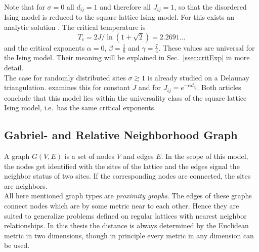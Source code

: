     Note that for \(\sigma = 0\) all \(d_{ij} = 1\) and therefore all
    \(J_{ij} = 1\), so that the disordered Ising model is reduced to the
    square lattice Ising model. For this exists an analytic solution \cite{Onsager1944}.
    The critical temperature is
    \begin{equation}
        T_c = 2J/\ln(1+\sqrt 2) = 2.2691...
        \label{eq:exactTc}
    \end{equation}
    and the critical exponents \(\alpha = 0\), \(\beta = \frac{1}{8}\)
    and \(\gamma = \frac{7}{4}\). These values are universal for the Ising
    model. Their meaning will be explained in Sec.\ \ref{ssec:critExp} in more detail.\\
    The case for randomly distributed sites \(\sigma \gtrsim 1\) is
    already studied on a Delaunay triangulation. \cite{Janke1994} examines
    this for constant \(J\) and \cite{Lima2000} for \(J_{ij} = e^{-\alpha d_{ij}}\).
    Both articles conclude that this model lies within the universality
    class of the square lattice Ising model, i.e.\ has the same critical
    exponents.

\subsection{Gabriel- and Relative Neighborhood Graph}
\label{ssec:graphtypes}
    A graph \(G(V,E)\) is a set of nodes \(V\) and edges \(E\). In the
    scope of this model, the nodes get identified with the sites of the
    lattice and the edges signal the neighbor status of two sites. If the
    corresponding nodes are connected, the sites are neighbors.\\
    All here mentioned graph types are \emph{proximity graphs}.
    The edges of these graphs connect nodes which are by some metric near
    to each other.
    Hence they are suited to generalize problems defined on regular
    lattices with nearest neighbor relationships.
    In this thesis the distance is always determined by the Euclidean
    metric in two dimensions, though in principle every metric in any
    dimension can be used.\\

